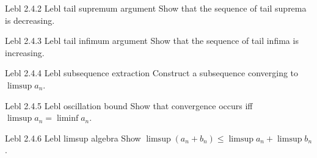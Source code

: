 \exstub
{Lebl 2.4.2}
{Lebl}
{tail supremum argument}
{Show that the sequence of tail suprema is decreasing.}

\exstub
{Lebl 2.4.3}
{Lebl}
{tail infimum argument}
{Show that the sequence of tail infima is increasing.}

\exstub
{Lebl 2.4.4}
{Lebl}
{subsequence extraction}
{Construct a subsequence converging to $\limsup a_n$.}

\exstub
{Lebl 2.4.5}
{Lebl}
{oscillation bound}
{Show that convergence occurs iff $\limsup a_n = \liminf a_n$.}

\exstub
{Lebl 2.4.6}
{Lebl}
{limsup algebra}
{Show $\limsup(a_n+b_n)\le\limsup a_n+\limsup b_n$.}
